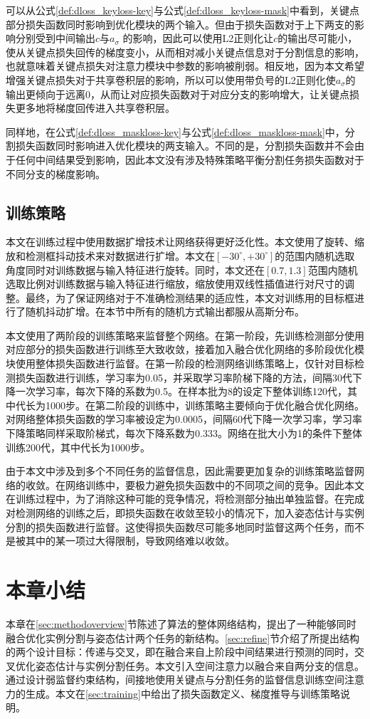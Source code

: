可以从公式\eqref{def:dloss_keyloss-key}与公式\eqref{def:dloss_keyloss-mask}中看到，关键点部分损失函数同时影响到优化模块的两个输入。但由于损失函数对于上下两支的影响分别受到中间输出$c$与$a_{\sigma}$ 的影响，因此可以使用L2正则化让$c$的输出尽可能小，使从关键点损失回传的梯度变小，从而相对减小关键点信息对于分割信息的影响，也就意味着关键点损失对注意力模块中参数的影响被削弱。相反地，因为本文希望增强关键点损失对于共享卷积层的影响，所以可以使用带负号的L2正则化使$a_{\sigma}$的输出更倾向于远离0，从而让对应损失函数对于对应分支的影响增大，让关键点损失更多地将梯度回传进入共享卷积层。

同样地，在公式\eqref{def:dloss_maskloss-key}与公式\eqref{def:dloss_maskloss-mask}中，分割损失函数同时影响进入优化模块的两支输入。不同的是，分割损失函数并不会由于任何中间结果受到影响，因此本文没有涉及特殊策略平衡分割任务损失函数对于不同分支的梯度影响。


\subsection{训练策略}
\label{subsec:trainingstrategy}

本文在训练过程中使用数据扩增技术让网络获得更好泛化性。本文使用了旋转、缩放和检测框抖动技术来对数据进行扩增。本文在$[-30^\circ, +30^\circ]$的范围内随机选取角度同时对训练数据与输入特征进行旋转。同时，本文还在$[0.7, 1.3]$范围内随机选取比例对训练数据与输入特征进行缩放，缩放使用双线性插值进行对尺寸的调整。最终，为了保证网络对于不准确检测结果的适应性，本文对训练用的目标框进行了随机抖动扩增。在本节中所有的随机方式输出都服从高斯分布。

本文使用了两阶段的训练策略来监督整个网络。在第一阶段，先训练检测部分使用对应部分的损失函数进行训练至大致收敛，接着加入融合优化网络的多阶段优化模块使用整体损失函数进行监督。在第一阶段的检测网络训练策略上，仅针对目标检测损失函数进行训练，学习率为0.05，并采取学习率阶梯下降的方法，间隔30代下降一次学习率，每次下降的系数为0.5。在样本批为8的设定下整体训练120代，其中代长为1000步。在第二阶段的训练中，训练策略主要倾向于优化融合优化网络。对网络整体损失函数的学习率被设定为0.0005，间隔60代下降一次学习率，学习率下降策略同样采取阶梯式，每次下降系数为0.333。网络在批大小为1的条件下整体训练200代，其中代长为1000步。

由于本文中涉及到多个不同任务的监督信息，因此需要更加复杂的训练策略监督网络的收敛。在网络训练中，要极力避免损失函数中的不同项之间的竞争。因此本文在训练过程中，为了消除这种可能的竞争情况，将检测部分抽出单独监督。在完成对检测网络的训练之后，即损失函数在收敛至较小的情况下，加入姿态估计与实例分割的损失函数进行监督。这使得损失函数尽可能多地同时监督这两个任务，而不是被其中的某一项过大得限制，导致网络难以收敛。

\section{本章小结}
本章在\ref{sec:methodoverview}节陈述了算法的整体网络结构，提出了一种能够同时融合优化实例分割与姿态估计两个任务的新结构。\ref{sec:refine}节介绍了所提出结构的两个设计目标：传递与交叉，即在融合来自上阶段中间结果进行预测的同时，交叉优化姿态估计与实例分割任务。本文引入空间注意力以融合来自两分支的信息。通过设计弱监督约束结构，间接地使用关键点与分割任务的监督信息训练空间注意力的生成。本文在\ref{sec:training}中给出了损失函数定义、梯度推导与训练策略说明。
